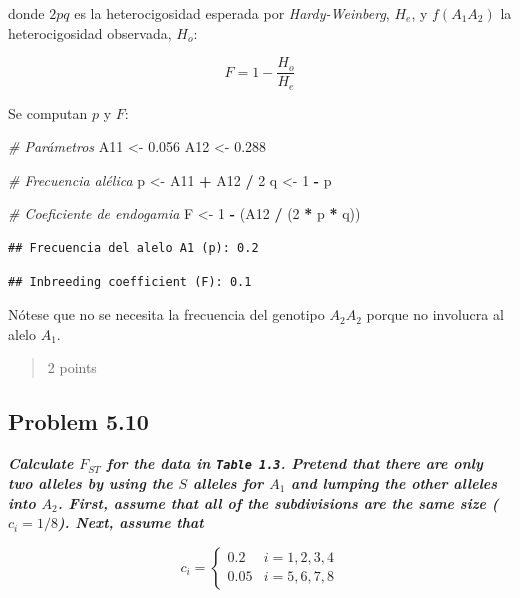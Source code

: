 \documentclass[
  11pt,
]{article}
\newenvironment{Shaded}{\begin{snugshade}}{\end{snugshade}}
\newcommand{\CommentTok}[1]{\textcolor[rgb]{0.56,0.35,0.01}{\textit{#1}}}
\newcommand{\DecValTok}[1]{\textcolor[rgb]{0.00,0.00,0.81}{#1}}
\newcommand{\FloatTok}[1]{\textcolor[rgb]{0.00,0.00,0.81}{#1}}
\newcommand{\NormalTok}[1]{#1}
\newcommand{\OtherTok}[1]{\textcolor[rgb]{0.56,0.35,0.01}{#1}}
\newcommand{\SpecialCharTok}[1]{\textcolor[rgb]{0.81,0.36,0.00}{\textbf{#1}}}
\begin{document}
donde \(2pq\) es la heterocigosidad esperada por \emph{Hardy-Weinberg},
\(H_e\), y \(f(A_1A_2)\) la heterocigosidad observada, \(H_o\):

\[
F = 1 - \frac{H_o}{H_e}
\]

Se computan \(p\) y \(F\):

\begin{Shaded}
\begin{Highlighting}[]
\CommentTok{\# Parámetros}
\NormalTok{A11 }\OtherTok{\textless{}{-}} \FloatTok{0.056}
\NormalTok{A12 }\OtherTok{\textless{}{-}} \FloatTok{0.288}

\CommentTok{\# Frecuencia alélica}
\NormalTok{p }\OtherTok{\textless{}{-}}\NormalTok{ A11 }\SpecialCharTok{+}\NormalTok{ A12 }\SpecialCharTok{/} \DecValTok{2}
\NormalTok{q }\OtherTok{\textless{}{-}} \DecValTok{1} \SpecialCharTok{{-}}\NormalTok{ p}

\CommentTok{\# Coeficiente de endogamia}
\NormalTok{F }\OtherTok{\textless{}{-}} \DecValTok{1} \SpecialCharTok{{-}}\NormalTok{ (A12 }\SpecialCharTok{/}\NormalTok{ (}\DecValTok{2} \SpecialCharTok{*}\NormalTok{ p }\SpecialCharTok{*}\NormalTok{ q))}
\end{Highlighting}
\end{Shaded}

\begin{verbatim}
## Frecuencia del alelo A1 (p): 0.2
\end{verbatim}

\begin{verbatim}
## Inbreeding coefficient (F): 0.1
\end{verbatim}

Nótese que no se necesita la frecuencia del genotipo \(A_2A_2\) porque
no involucra al alelo \(A_1\).

\begin{quote}
2 points
\end{quote}

\subsection{Problem 5.10}\label{problem-5.10}

\textbf{\emph{Calculate \(F_{ST}\) for the data in \texttt{Table\ 1.3}.
Pretend that there are only two alleles by using the \(S\) alleles for
\(A_1\) and lumping the other alleles into \(A_2\). First, assume that
all of the subdivisions are the same size (\(c_i = 1/8\)). Next, assume
that}}

\[
c_i =
\begin{cases}
0.2 & i = 1,2,3,4 \\
0.05 & i = 5,6,7,8
\end{cases}
\]
\end{document}

